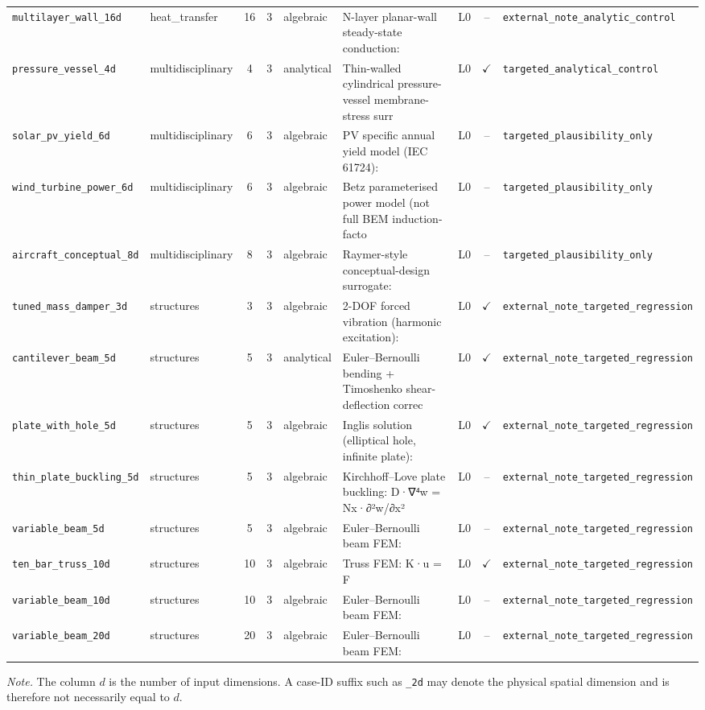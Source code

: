 \begin{table}[htbp]
\begin{tabular}{@{}llcclllcl@{}}
\texttt{multilayer\_wall\_16d} & heat\_transfer & 16 & 3 & algebraic & N-layer planar-wall steady-state conduction: & L0 & -- & \texttt{external\_note\_analytic\_control} \\
\texttt{pressure\_vessel\_4d} & multidisciplinary & 4 & 3 & analytical & Thin-walled cylindrical pressure-vessel membrane-stress surr & L0 & $\checkmark$ & \texttt{targeted\_analytical\_control} \\
\texttt{solar\_pv\_yield\_6d} & multidisciplinary & 6 & 3 & algebraic & PV specific annual yield model (IEC 61724): & L0 & -- & \texttt{targeted\_plausibility\_only} \\
\texttt{wind\_turbine\_power\_6d} & multidisciplinary & 6 & 3 & algebraic & Betz parameterised power model (not full BEM induction-facto & L0 & -- & \texttt{targeted\_plausibility\_only} \\
\texttt{aircraft\_conceptual\_8d} & multidisciplinary & 8 & 3 & algebraic & Raymer-style conceptual-design surrogate: & L0 & -- & \texttt{targeted\_plausibility\_only} \\
\texttt{tuned\_mass\_damper\_3d} & structures & 3 & 3 & algebraic & 2-DOF forced vibration (harmonic excitation): & L0 & $\checkmark$ & \texttt{external\_note\_targeted\_regression} \\
\texttt{cantilever\_beam\_5d} & structures & 5 & 3 & analytical & Euler–Bernoulli bending + Timoshenko shear-deflection correc & L0 & $\checkmark$ & \texttt{external\_note\_targeted\_regression} \\
\texttt{plate\_with\_hole\_5d} & structures & 5 & 3 & algebraic & Inglis solution (elliptical hole, infinite plate): & L0 & $\checkmark$ & \texttt{external\_note\_targeted\_regression} \\
\texttt{thin\_plate\_buckling\_5d} & structures & 5 & 3 & algebraic & Kirchhoff–Love plate buckling: D·∇⁴w = Nx·∂²w/∂x² & L0 & -- & \texttt{external\_note\_targeted\_regression} \\
\texttt{variable\_beam\_5d} & structures & 5 & 3 & algebraic & Euler–Bernoulli beam FEM: & L0 & -- & \texttt{external\_note\_targeted\_regression} \\
\texttt{ten\_bar\_truss\_10d} & structures & 10 & 3 & algebraic & Truss FEM: K·u = F & L0 & $\checkmark$ & \texttt{external\_note\_targeted\_regression} \\
\texttt{variable\_beam\_10d} & structures & 10 & 3 & algebraic & Euler–Bernoulli beam FEM: & L0 & -- & \texttt{external\_note\_targeted\_regression} \\
\texttt{variable\_beam\_20d} & structures & 20 & 3 & algebraic & Euler–Bernoulli beam FEM: & L0 & -- & \texttt{external\_note\_targeted\_regression} \\
\bottomrule
\end{tabular}
\end{table}
\smallskip
\noindent\textit{Note.} The column $d$ is the number of input dimensions. A case-ID suffix such as \texttt{\_2d} may denote the physical spatial dimension and is therefore not necessarily equal to $d$.
